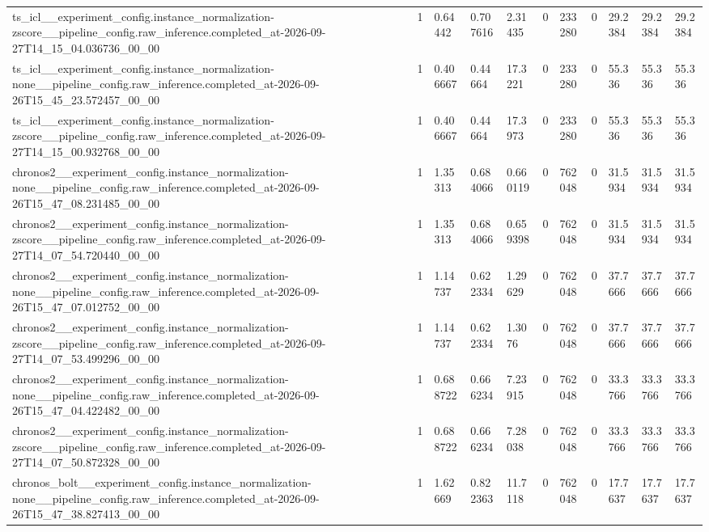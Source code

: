 \begin{tabular}{lllllllllll}
ts\_icl\_\_experiment\_config.instance\_normalization-zscore\_\_pipeline\_config.raw\_inference.completed\_at-2026-09-27T14\_15\_04.036736\_00\_00 & 1 & 0.64442 & 0.707616 & 2.31435 & 0 & 233280 & 0 & 29.2384 & 29.2384 & 29.2384 \\
ts\_icl\_\_experiment\_config.instance\_normalization-none\_\_pipeline\_config.raw\_inference.completed\_at-2026-09-26T15\_45\_23.572457\_00\_00 & 1 & 0.406667 & 0.44664 & 17.3221 & 0 & 233280 & 0 & 55.336 & 55.336 & 55.336 \\
ts\_icl\_\_experiment\_config.instance\_normalization-zscore\_\_pipeline\_config.raw\_inference.completed\_at-2026-09-27T14\_15\_00.932768\_00\_00 & 1 & 0.406667 & 0.44664 & 17.3973 & 0 & 233280 & 0 & 55.336 & 55.336 & 55.336 \\
chronos2\_\_experiment\_config.instance\_normalization-none\_\_pipeline\_config.raw\_inference.completed\_at-2026-09-26T15\_47\_08.231485\_00\_00 & 1 & 1.35313 & 0.684066 & 0.660119 & 0 & 762048 & 0 & 31.5934 & 31.5934 & 31.5934 \\
chronos2\_\_experiment\_config.instance\_normalization-zscore\_\_pipeline\_config.raw\_inference.completed\_at-2026-09-27T14\_07\_54.720440\_00\_00 & 1 & 1.35313 & 0.684066 & 0.659398 & 0 & 762048 & 0 & 31.5934 & 31.5934 & 31.5934 \\
chronos2\_\_experiment\_config.instance\_normalization-none\_\_pipeline\_config.raw\_inference.completed\_at-2026-09-26T15\_47\_07.012752\_00\_00 & 1 & 1.14737 & 0.622334 & 1.29629 & 0 & 762048 & 0 & 37.7666 & 37.7666 & 37.7666 \\
chronos2\_\_experiment\_config.instance\_normalization-zscore\_\_pipeline\_config.raw\_inference.completed\_at-2026-09-27T14\_07\_53.499296\_00\_00 & 1 & 1.14737 & 0.622334 & 1.3076 & 0 & 762048 & 0 & 37.7666 & 37.7666 & 37.7666 \\
chronos2\_\_experiment\_config.instance\_normalization-none\_\_pipeline\_config.raw\_inference.completed\_at-2026-09-26T15\_47\_04.422482\_00\_00 & 1 & 0.688722 & 0.666234 & 7.23915 & 0 & 762048 & 0 & 33.3766 & 33.3766 & 33.3766 \\
chronos2\_\_experiment\_config.instance\_normalization-zscore\_\_pipeline\_config.raw\_inference.completed\_at-2026-09-27T14\_07\_50.872328\_00\_00 & 1 & 0.688722 & 0.666234 & 7.28038 & 0 & 762048 & 0 & 33.3766 & 33.3766 & 33.3766 \\
chronos\_bolt\_\_experiment\_config.instance\_normalization-none\_\_pipeline\_config.raw\_inference.completed\_at-2026-09-26T15\_47\_38.827413\_00\_00 & 1 & 1.62669 & 0.822363 & 11.7118 & 0 & 762048 & 0 & 17.7637 & 17.7637 & 17.7637 \\

\end{tabular}
